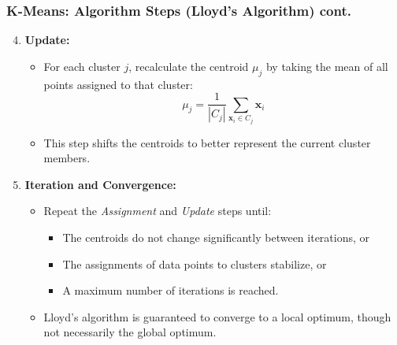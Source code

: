 \documentclass[aspectratio=169]{beamer}
\begin{document}
    \begin{frame}
        \frametitle{K-Means: Algorithm Steps (Lloyd's Algorithm) cont.}
        \begin{enumerate}
            \setcounter{enumi}{3}
            \item \textbf{Update:}
            \begin{itemize}
                \item For each cluster \(j\), recalculate the centroid \(\mu_j\) by taking the mean of all points assigned to that cluster:
                \[
                \mu_j = \frac{1}{|C_j|} \sum_{\mathbf{x}_i \in C_j} \mathbf{x}_i
                \]
                \item This step shifts the centroids to better represent the current cluster members.
            \end{itemize}
        \item \textbf{Iteration and Convergence:}
            \begin{itemize}
                \item Repeat the \emph{Assignment} and \emph{Update} steps until:
                    \begin{itemize}
                        \item The centroids do not change significantly between iterations, or
                        \item The assignments of data points to clusters stabilize, or
                        \item A maximum number of iterations is reached.
                    \end{itemize}
                \item Lloyd's algorithm is guaranteed to converge to a local optimum, though not necessarily the global optimum.
            \end{itemize}
    \end{enumerate}
    \end{frame} 
\end{document}
